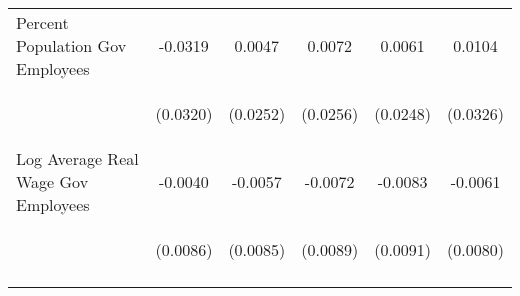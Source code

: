 \begin{center}
\begin{tabular}{lccccc}
\noalign{\smallskip}Percent Population Gov Employees & \begin{scriptsize}-0.0319\end{scriptsize} & \begin{scriptsize}0.0047\end{scriptsize} & \begin{scriptsize}0.0072\end{scriptsize} & \begin{scriptsize}0.0061\end{scriptsize} & \begin{scriptsize}0.0104\end{scriptsize}\\
 & \begin{scriptsize}(0.0320)\end{scriptsize} & \begin{scriptsize}(0.0252)\end{scriptsize} & \begin{scriptsize}(0.0256)\end{scriptsize} & \begin{scriptsize}(0.0248)\end{scriptsize} & \begin{scriptsize}(0.0326)\end{scriptsize}\\
\noalign{\smallskip}Log Average Real Wage Gov Employees & \begin{scriptsize}-0.0040\end{scriptsize} & \begin{scriptsize}-0.0057\end{scriptsize} & \begin{scriptsize}-0.0072\end{scriptsize} & \begin{scriptsize}-0.0083\end{scriptsize} & \begin{scriptsize}-0.0061\end{scriptsize}\\
 & \begin{scriptsize}(0.0086)\end{scriptsize} & \begin{scriptsize}(0.0085)\end{scriptsize} & \begin{scriptsize}(0.0089)\end{scriptsize} & \begin{scriptsize}(0.0091)\end{scriptsize} & \begin{scriptsize}(0.0080)\end{scriptsize}\\
\noalign{\smallskip}\hline\end{tabular}\\
\end{center}

